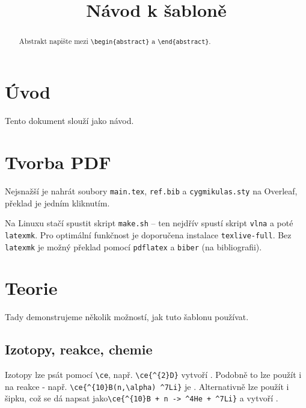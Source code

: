 \documentclass{cygclanek}
\begin{document}
\title{Návod k šabloně}



\maketitle
\begin{abstract}
    Abstrakt napište mezi \verb|\begin{abstract}| a \verb|\end{abstract}|.
\end{abstract}

\section{Úvod}

Tento dokument slouží jako návod. 

\section{Tvorba PDF}
Nejsnažší je nahrát soubory \verb|main.tex|, \verb|ref.bib| a \verb|cygmikulas.sty| na Overleaf, překlad je 
jedním kliknutím.

Na Linuxu stačí spustit skript \verb|make.sh| -- ten nejdřív spustí skript \verb|vlna| \cite{vlna} 
a poté \verb|latexmk|. Pro optimální funkčnost je doporučena instalace \verb|texlive-full|. 
Bez \verb|latexmk| je možný překlad pomocí \verb|pdflatex| a \verb|biber| (na bibliografii).


\section{Teorie}
Tady demonstrujeme několik možností, jak tuto šablonu používat.

\subsection{Izotopy, reakce, chemie}
Izotopy lze psát pomocí \verb|\ce|, např. \verb|\ce{^{2}D}| vytvoří . Podobně to lze použít i na 
reakce - např. \verb|\ce{^{10}B(n,\alpha) ^7Li}| je . Alternativně lze 
použít i šipku, což se dá napsat jako\newline\verb|\ce{^{10}B + n -> ^4He + ^7Li}| 
a vytvoří . 
\end{document}
